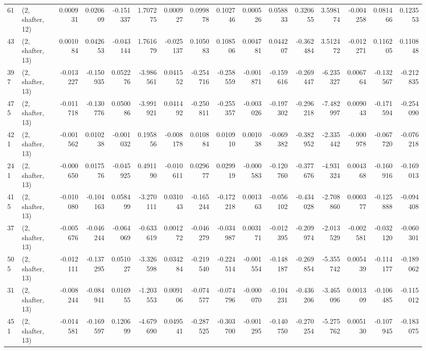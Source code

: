 \begin{tabular}{llrrrrrrrrrrrrrr}
61  &  (2, shafter, 12) &   0.000931 &  0.020609 & -0.151337 &    1.707275 &  0.000927 &   0.099878 &  0.102746 &  0.000526 &  0.058833 &  0.320655 &    3.598174 & -0.004258 &  0.081466 &  0.123553 \\
43  &  (2, shafter, 13) &   0.001084 &  0.042653 & -0.043144 &    1.761679 & -0.025137 &   0.105083 &  0.108506 &  0.004781 &  0.044207 & -0.362484 &    3.512472 & -0.012271 &  0.116205 &  0.110848 \\
397 &  (2, shafter, 13) &  -0.013227 & -0.150935 &  0.052276 &   -3.986561 &  0.041552 &  -0.254716 & -0.258559 & -0.001871 & -0.159616 & -0.269447 &   -6.235327 &  0.006764 & -0.132567 & -0.212835 \\
475 &  (2, shafter, 13) &  -0.011718 & -0.130776 &  0.050086 &   -3.991921 &  0.041492 &  -0.250811 & -0.255357 & -0.003026 & -0.197302 & -0.296218 &   -7.482997 &  0.009043 & -0.171594 & -0.254090 \\
421 &  (2, shafter, 13) &  -0.001562 &  0.010238 & -0.001032 &    0.195856 & -0.008178 &   0.010884 &  0.010910 &  0.001038 & -0.069382 & -0.382952 &   -2.335442 & -0.000978 & -0.067720 & -0.076218 \\
241 &  (2, shafter, 13) &  -0.000650 &  0.017576 & -0.045925 &    0.491190 & -0.010611 &   0.029677 &  0.029919 & -0.000583 & -0.120760 & -0.377676 &   -4.931324 &  0.004368 & -0.160916 & -0.169013 \\
415 &  (2, shafter, 13) &  -0.010080 & -0.104163 &  0.058499 &   -3.270111 &  0.031043 &  -0.165244 & -0.172218 &  0.001363 & -0.056102 & -0.434028 &   -2.708860 &  0.000377 & -0.125888 & -0.094408 \\
37  &  (2, shafter, 13) &  -0.005676 & -0.046244 & -0.064069 &   -0.633619 &  0.001272 &  -0.046279 & -0.034987 &  0.003171 & -0.012395 & -0.209974 &   -2.013529 & -0.002581 & -0.032120 & -0.060301 \\
505 &  (2, shafter, 13) &  -0.012111 & -0.137295 &  0.051027 &   -3.326598 &  0.034284 &  -0.219540 & -0.224514 & -0.001554 & -0.148187 & -0.269854 &   -5.355742 &  0.005439 & -0.114177 & -0.189062 \\
31  &  (2, shafter, 13) &  -0.008244 & -0.084941 &  0.016955 &   -1.203553 &  0.009106 &  -0.074577 & -0.074796 & -0.000070 & -0.104231 & -0.436206 &   -3.465096 &  0.001309 & -0.106485 & -0.115012 \\
451 &  (2, shafter, 13) &  -0.014581 & -0.169597 &  0.120699 &   -4.679690 &  0.049541 &  -0.287525 & -0.303700 & -0.001295 & -0.140750 & -0.270254 &   -5.275762 &  0.005130 & -0.107945 & -0.183075 \\

\end{tabular}
